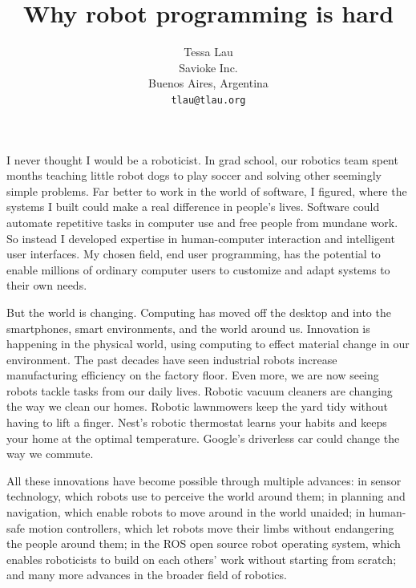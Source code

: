 \documentclass[10pt,twocolumn]{article}
\begin{document}
\title {Why robot programming is hard}
\author {Tessa Lau \\
Savioke Inc.\\
Buenos Aires, Argentina \\
{\tt tlau@tlau.org}
}
\maketitle

I never thought I would be a roboticist. In grad school, our robotics team spent months teaching little robot dogs to play soccer and solving other seemingly simple problems. Far better to work in the world of software, I figured, where the systems I built could make a real difference in people's lives. Software could automate repetitive tasks in computer use and free people from mundane work. So instead I developed expertise in human-computer interaction and intelligent user interfaces. My chosen field, end user programming, has the potential to enable millions of ordinary computer users to customize and adapt systems to their own needs.

But the world is changing. Computing has moved off the desktop and into the smartphones, smart environments, and the world around us. Innovation is happening in the physical world, using computing to effect material change in our environment. The past decades have seen industrial robots increase manufacturing efficiency on the factory floor. Even more, we are now seeing robots tackle tasks from our daily lives. Robotic vacuum cleaners are changing the way we clean our homes. Robotic lawnmowers keep the yard tidy without having to lift a finger. Nest's robotic thermostat learns your habits and keeps your home at the optimal temperature. Google's driverless car could change the way we commute.

All these innovations have become possible through multiple advances: in sensor technology, which robots use to perceive the world around them; in planning and navigation, which enable robots to move around in the world unaided; in human-safe motion controllers, which let robots move their limbs without endangering the people around them; in the ROS open source robot operating system, which enables roboticists to build on each others' work without starting from scratch; and many more advances in the broader field of robotics.
\end{document}
